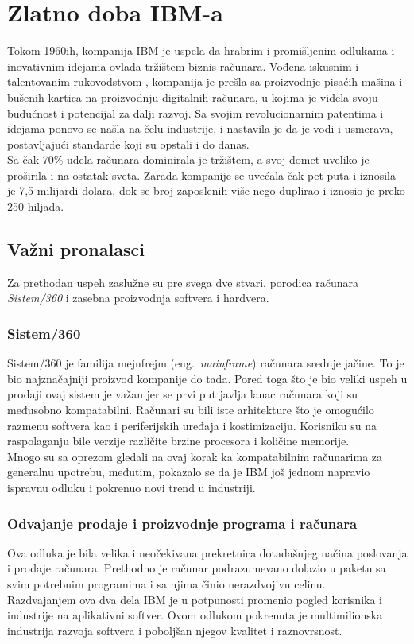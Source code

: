 \documentclass[a4paper]{article}
\begin{document}
\section{Zlatno doba IBM-a}%
Tokom 1960ih, kompanija IBM je uspela da hrabrim i promišljenim odlukama i inovativnim idejama ovlada tržištem biznis računara. Vođena iskusnim i talentovanim rukovodstvom%
, kompanija je prešla sa proizvodnje pisaćih mašina i bušenih kartica na proizvodnju digitalnih računara, u kojima je videla svoju budućnost i potencijal za dalji razvoj.
Sa svojim revolucionarnim patentima i idejama ponovo se našla na čelu industrije, i nastavila je da je vodi i usmerava, postavljajući standarde koji su opstali i do danas.\\
Sa čak 70\% udela računara dominirala je tržištem, %
a svoj domet uveliko je proširila i na ostatak sveta. Zarada kompanije se uvećala čak pet puta i iznosila je 7,5 milijardi dolara, dok se broj zaposlenih više nego duplirao i iznosio je preko 250 hiljada. %
\subsection{Važni pronalasci} 
Za prethodan uspeh zaslužne su pre svega dve stvari, porodica računara \emph{Sistem/360}  i zasebna proizvodnja softvera i hardvera.
\subsubsection*{Sistem/360}Sistem/360 je familija mejnfrejm (eng.~{\em mainframe}) računara srednje jačine.\cite{timeline} To je bio najznačajniji proizvod kompanije do tada. Pored toga što je bio veliki uspeh u prodaji ovaj sistem je važan jer se prvi put javlja lanac računara koji su međusobno kompatabilni.
Računari su bili iste arhitekture što je omogućilo razmenu softvera kao i periferijskih uređaja i kostimizaciju. Korisniku su na raspolaganju bile verzije različite brzine procesora i količine memorije. \\%
Mnogo su sa oprezom gledali na ovaj korak ka kompatabilnim računarima za generalnu upotrebu, međutim, pokazalo se da je IBM još jednom napravio ispravnu odluku i pokrenuo novi trend u industriji.%
\subsubsection*{Odvajanje prodaje i proizvodnje programa i računara} Ova odluka je bila velika i neočekivana prekretnica dotadašnjeg načina poslovanja i prodaje računara. Prethodno je računar podrazumevano dolazio u paketu sa svim potrebnim programima i sa njima činio nerazdvojivu celinu.\\
Razdvajanjem ova dva dela IBM je u potpunosti promenio pogled korisnika i industrije na aplikativni softver. Ovom odlukom pokrenuta je multimilionska industrija razvoja softvera i poboljšan njegov kvalitet i raznovrsnost. 
\end{document}
